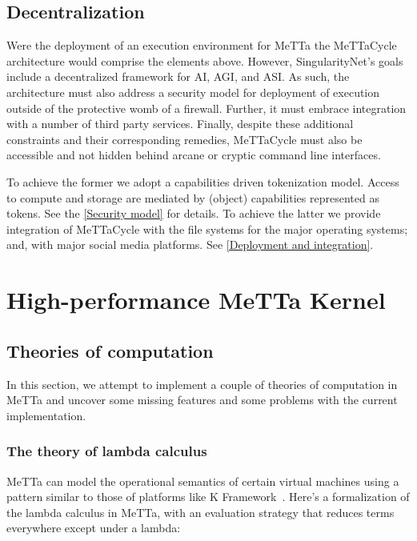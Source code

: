 \documentclass{article}
\begin{document}
\subsection{Decentralization}

Were the deployment of an execution environment for MeTTa the MeTTaCycle architecture would comprise the elements above. However, SingularityNet's goals include a decentralized framework for AI, AGI, and ASI. As such, the architecture must also address a security model for deployment of execution outside of the protective womb of a firewall. Further, it must embrace integration with a number of third party services. Finally, despite these additional constraints and their corresponding remedies, MeTTaCycle must also be accessible and not hidden behind arcane or cryptic command line interfaces.

To achieve the former we adopt a capabilities driven tokenization model. Access to compute and storage are mediated by (object) capabilities represented as tokens. See the \ref{Security model} for details. To achieve the latter we provide integration of MeTTaCycle with the file systems for the major operating systems; and, with major social media platforms. See \ref{Deployment and integration}.

\section{High-performance MeTTa Kernel}

\subsection{Theories of computation}
\label{Theories of computation}

In this section, we attempt to implement a couple of theories of computation in MeTTa and uncover some missing features and some problems with the current implementation.

\subsubsection{The theory of lambda calculus}
MeTTa can model the operational semantics of certain virtual machines using a pattern similar to those of platforms like K Framework~\cite{kframework}.  Here's a formalization of the lambda calculus in MeTTa, with an evaluation strategy that reduces terms everywhere except under a lambda:
\end{document}
